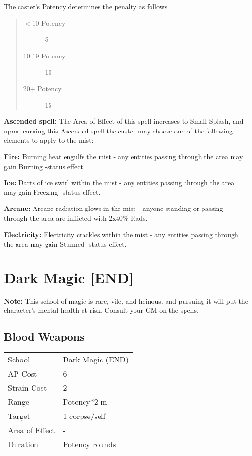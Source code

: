 \documentclass[11pt,a4paper,twocolumn]{book}
\begin{document}
The caster's Potency determines the penalty as follows:

\begin{quote}
	\begin{description}
		\item[$<$10 Potency] 	-5
		\item[10-19 Potency] 	-10
		\item[20+ Potency] 		-15 
	\end{description}
\end{quote}

\bigskip

\textbf{Ascended spell:} The Area of Effect of this spell increases to Small Splash, and upon learning this Ascended spell the caster may choose one of the following elements to apply to the mist:

\smallskip

\begin{compactitem}
	\item \textbf{Fire:} Burning heat engulfs the mist - any entities passing through the area may gain Burning -status effect.
	\item \textbf{Ice:} Darts of ice swirl within the mist - any entities passing through the area may gain Freezing -status effect.
	\item \textbf{Arcane:} Arcane radiation glows in the mist - anyone standing or passing through the area are inflicted with 2x40\% Rads.
	\item \textbf{Electricity:} Electricity crackles within the mist - any entities passing through the area may gain Stunned -status effect.
\end{compactitem}

\newpage

\section*{Dark Magic [END]}
\textbf{Note:} This school of magic is rare, vile, and heinous, and pursuing it will put the character's mental health at risk. Consult your GM on the spells.

\subsection*{Blood Weapons}
{
	\begin{tabu} to 75mm{| X[l,4] | X[l,7] |}
		\hline
		School 			& Dark Magic (END) 		\\
		AP Cost	      	& 6 					\\
		Strain Cost     & 2 					\\
		Range     		& Potency*2 m				\\
		Target      	& 1 corpse/self 		\\
		Area of Effect  & - 	 				\\
		Duration     	& Potency rounds 		\\ \hline
	\end{tabu}
	
}
\end{document}

